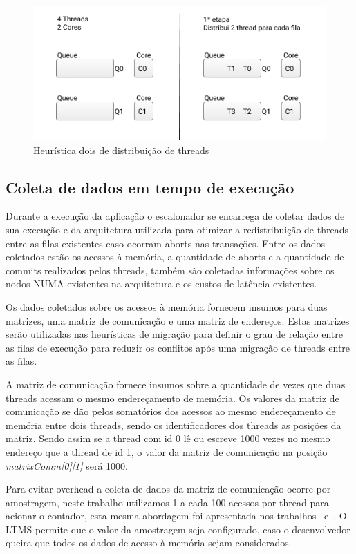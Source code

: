 \documentclass[diss,capa]{texufpel}
\begin{document}
\begin{figure}[htbp]
 \centering
 \includegraphics[scale=.8]{images/Queue_two.png}
\caption{Heurística dois de distribuição de threads}
\label{queue_two}
\end{figure}


\subsection{Coleta de dados em tempo de execução}
\label{coleta}

Durante a execução da aplicação o escalonador se encarrega de coletar dados de sua execução e da arquitetura utilizada para otimizar a redistribuição de threads entre as filas existentes caso ocorram aborts nas transações. Entre os dados coletados estão os acessos à memória, a quantidade de aborts e a quantidade de commits realizados pelos threads, também são coletadas informações sobre os nodos NUMA existentes na arquitetura e os custos de latência existentes.

Os dados coletados sobre os acessos à memória fornecem insumos para duas matrizes, uma matriz de comunicação e uma matriz de endereços. Estas matrizes serão utilizadas nas heurísticas de migração para definir o grau de relação entre as filas de execução para reduzir os conflitos após uma migração de threads entre as filas.

A matriz de comunicação fornece insumos sobre a quantidade de vezes que duas threads acessam o mesmo endereçamento de memória. Os valores da matriz de comunicação se dão pelos somatórios dos acessos ao mesmo endereçamento de memória entre dois threads, sendo os identificadores dos threads as posições da matriz. Sendo assim se a thread com id 0 lê ou escreve 1000 vezes no mesmo endereço que a thread de id 1, o valor da matriz de comunicação na posição \emph{matrixComm[0][1]} será 1000.

Para evitar overhead a coleta de dados da matriz de comunicação ocorre por amostragem, neste trabalho utilizamos 1 a cada 100 acessos por thread para acionar o contador, esta mesma abordagem foi apresentada nos trabalhos~\cite{pasqualin2020online} e~\cite{pasqualin2020thread}. O LTMS permite que o valor da amostragem seja configurado, caso o desenvolvedor queira que todos os dados de acesso à memória sejam considerados.
\end{document}
